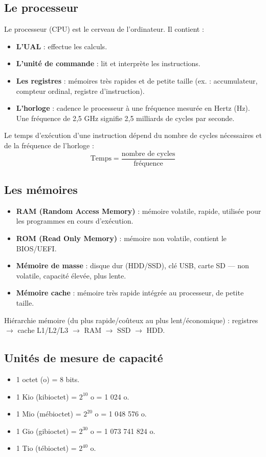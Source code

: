 \subsection{Le processeur}
Le processeur (CPU) est le cerveau de l’ordinateur. Il contient :
\begin{itemize}
    \item \textbf{L’UAL} : effectue les calculs.
    \item \textbf{L’unité de commande} : lit et interprète les instructions.
    \item \textbf{Les registres} : mémoires très rapides et de petite taille (ex. : accumulateur, compteur ordinal, registre d’instruction).
    \item \textbf{L’horloge} : cadence le processeur à une fréquence mesurée en Hertz (Hz). Une fréquence de 2,5 GHz signifie 2,5 milliards de cycles par seconde.
\end{itemize}

\begin{propriete}
Le temps d’exécution d’une instruction dépend du nombre de cycles nécessaires et de la fréquence de l’horloge :
\[
\text{Temps} = \frac{\text{nombre de cycles}}{\text{fréquence}}
\]
\end{propriete}

\subsection{Les mémoires}
\begin{itemize}
    \item \textbf{RAM (Random Access Memory)} : mémoire volatile, rapide, utilisée pour les programmes en cours d’exécution.
    \item \textbf{ROM (Read Only Memory)} : mémoire non volatile, contient le BIOS/UEFI.
    \item \textbf{Mémoire de masse} : disque dur (HDD/SSD), clé USB, carte SD — non volatile, capacité élevée, plus lente.
    \item \textbf{Mémoire cache} : mémoire très rapide intégrée au processeur, de petite taille.
\end{itemize}

\begin{aretenir}
Hiérarchie mémoire (du plus rapide/coûteux au plus lent/économique) : registres $\rightarrow$ cache L1/L2/L3 $\rightarrow$ RAM $\rightarrow$ SSD $\rightarrow$ HDD.
\end{aretenir}

\subsection{Unités de mesure de capacité}
\begin{itemize}
    \item 1 octet (o) = 8 bits.
    \item 1 Kio (kibioctet) = $2^{10}$ o = 1 024 o.
    \item 1 Mio (mébioctet) = $2^{20}$ o = 1 048 576 o.
    \item 1 Gio (gibioctet) = $2^{30}$ o = 1 073 741 824 o.
    \item 1 Tio (tébioctet) = $2^{40}$ o.
\end{itemize}

